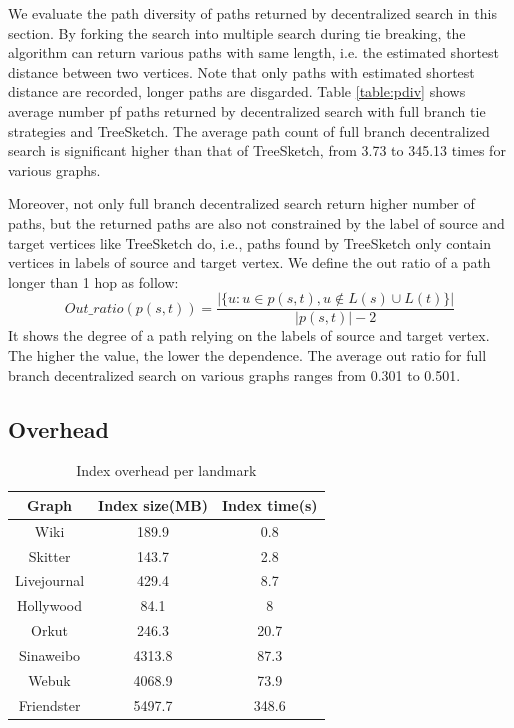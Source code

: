 We evaluate the path diversity of paths returned by decentralized search in this section. By forking the search into multiple search during tie breaking, the algorithm can return various paths with same length, i.e. the estimated shortest distance between two vertices. Note that only paths with estimated shortest distance are recorded, longer paths are disgarded. Table \ref{table:pdiv} shows average number pf paths returned by decentralized search with full branch tie strategies and TreeSketch. The average path count of full branch decentralized search is significant higher than that of TreeSketch, from 3.73 to 345.13 times for various graphs. 

Moreover, not only full branch decentralized search return higher number of paths, but the returned paths are also not constrained by the label of source and target vertices like TreeSketch do, i.e., paths found by TreeSketch only contain vertices in labels of source and target vertex. We define the out ratio of a path longer than 1 hop as follow:
\[
Out\_ratio(p(s,t)) = \frac{|\{u:u \in p(s,t), u \notin L(s) \cup L(t)\}|}{|p(s,t)| - 2}
\]
It shows the degree of a path relying on the labels of source and target vertex. The higher the value, the lower the dependence. The average out ratio for full branch decentralized search on various graphs ranges from 0.301 to 0.501.

\subsection{Overhead}
\label{eval_overhead}

\begin{table}
		\caption{Index overhead per landmark}
    \label{table:ioh}
    \centering
    \begin{tabular}{c|cc} \hline
				Graph&Index size(MB)&Index time(s)\\ \hline
				Wiki&189.9&0.8 \\ 
				Skitter&143.7&2.8 \\ 
				Livejournal&429.4&8.7 \\ 
				Hollywood&84.1&8 \\ 
				Orkut&246.3&20.7 \\ 
				Sinaweibo&4313.8&87.3 \\ 
				Webuk&4068.9&73.9 \\ 
				Friendster&5497.7&348.6 \\ \hline
    \end{tabular}
\end{table}


